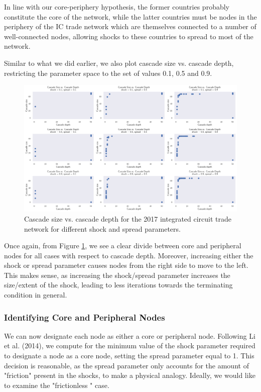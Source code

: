 \documentclass[12pt,letterpaper]{report}
\begin{document}
	In line with our core-periphery hypothesis, the former countries probably constitute the core of the network, while the latter countries must be nodes in the periphery of the IC trade network which are themselves connected to a number of well-connected nodes, allowing shocks to these countries to spread to most of the network. 
	
	Similar to what we did earlier, we also plot cascade size vs. cascade depth, restricting the parameter space to the set of values 0.1, 0.5 and 0.9.
	
	\begin{figure}[!h]
		\centering
		\includegraphics[width=\textwidth]{Fig521-CascadeSizevsDepth.png}
		\caption{Cascade size vs. cascade depth for the 2017 integrated circuit trade network for different shock and spread parameters.}\label{fig:520CascadeSizevsDepth}
	\end{figure}
	
	Once again, from Figure \ref{fig:520CascadeSizevsDepth}, we see a clear divide between core and peripheral nodes for all cases with respect to cascade depth. Moreover, increasing either the shock or spread parameter causes nodes from the right side to move to the left. This makes sense, as increasing the shock/spread parameter increases the size/extent of the shock, leading to less iterations towards the terminating condition in general. 
	
	\subsubsection{Identifying Core and Peripheral Nodes}
	\label{ssec:5412coreperiphery}		
	We can now designate each node as either a core or peripheral node. Following Li et al. (2014), we compute for the minimum value of the shock parameter required to designate a node as a core node, setting the spread parameter equal to 1. This decision is reasonable, as the spread parameter only accounts for the amount of "friction" present in the shocks, to make a physical analogy. Ideally, we would like to examine the "frictionless " case.
	
\end{document}
